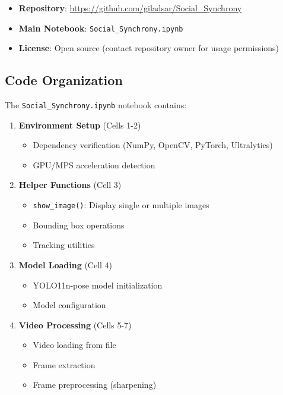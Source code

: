 \documentclass[11pt]{article}
\begin{document}
\begin{itemize}
    \item \textbf{Repository}: \url{https://github.com/giladsar/Social_Synchrony}
    \item \textbf{Main Notebook}: \texttt{Social\_Synchrony.ipynb}
    \item \textbf{License}: Open source (contact repository owner for usage permissions)
\end{itemize}

\subsection{Code Organization}
The \texttt{Social\_Synchrony.ipynb} notebook contains:

\begin{enumerate}
    \item \textbf{Environment Setup} (Cells 1-2)
    \begin{itemize}
        \item Dependency verification (NumPy, OpenCV, PyTorch, Ultralytics)
        \item GPU/MPS acceleration detection
    \end{itemize}
    
    \item \textbf{Helper Functions} (Cell 3)
    \begin{itemize}
        \item \texttt{show\_image()}: Display single or multiple images
        \item Bounding box operations
        \item Tracking utilities
    \end{itemize}
    
    \item \textbf{Model Loading} (Cell 4)
    \begin{itemize}
        \item YOLO11n-pose model initialization
        \item Model configuration
    \end{itemize}
    
    \item \textbf{Video Processing} (Cells 5-7)
    \begin{itemize}
        \item Video loading from file
        \item Frame extraction
        \item Frame preprocessing (sharpening)
    \end{itemize}
    

\end{enumerate}
\end{document}
